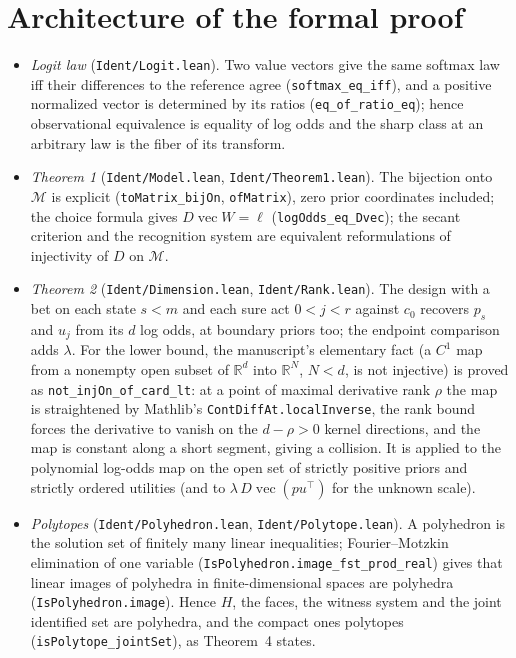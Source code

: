 \documentclass[11pt]{article}
\newcommand{\R}{\mathbb R}
\newcommand{\M}{\mathcal M}
\DeclareMathOperator{\vecop}{vec}
\begin{document}
\section{Architecture of the formal proof}

\begin{itemize}
\item \emph{Logit law} (\texttt{Ident/Logit.lean}). Two value vectors give the same softmax law iff their differences to the reference agree (\texttt{softmax\_eq\_iff}), and a positive normalized vector is determined by its ratios (\texttt{eq\_of\_ratio\_eq}); hence observational equivalence is equality of log odds and the sharp class at an arbitrary law is the fiber of its transform.
\item \emph{Theorem 1} (\texttt{Ident/Model.lean}, \texttt{Ident/Theorem1.lean}). The bijection onto $\M$ is explicit (\texttt{toMatrix\_bijOn}, \texttt{ofMatrix}), zero prior coordinates included; the choice formula gives $D\vecop W=\ell$ (\texttt{logOdds\_eq\_Dvec}); the secant criterion and the recognition system are equivalent reformulations of injectivity of $D$ on $\M$.
\item \emph{Theorem 2} (\texttt{Ident/Dimension.lean}, \texttt{Ident/Rank.lean}). The design with a bet on each state $s<m$ and each sure act $0<j<r$ against $c_0$ recovers $p_s$ and $u_j$ from its $d$ log odds, at boundary priors too; the endpoint comparison adds $\lambda$. For the lower bound, the manuscript's elementary fact (a $C^1$ map from a nonempty open subset of $\R^d$ into $\R^N$, $N<d$, is not injective) is proved as \texttt{not\_injOn\_of\_card\_lt}: at a point of maximal derivative rank $\rho$ the map is straightened by Mathlib's \texttt{ContDiffAt.localInverse}, the rank bound forces the derivative to vanish on the $d-\rho>0$ kernel directions, and the map is constant along a short segment, giving a collision. It is applied to the polynomial log-odds map on the open set of strictly positive priors and strictly ordered utilities (and to $\lambda\,D\vecop(pu^\top)$ for the unknown scale).
\item \emph{Polytopes} (\texttt{Ident/Polyhedron.lean}, \texttt{Ident/Polytope.lean}). A polyhedron is the solution set of finitely many linear inequalities; Fourier--Motzkin elimination of one variable (\texttt{IsPolyhedron.image\_fst\_prod\_real}) gives that linear images of polyhedra in finite-dimensional spaces are polyhedra (\texttt{IsPolyhedron.image}). Hence $H$, the faces, the witness system and the joint identified set are polyhedra, and the compact ones polytopes (\texttt{isPolytope\_jointSet}), as Theorem~4 states.

\end{itemize}
\end{document}
